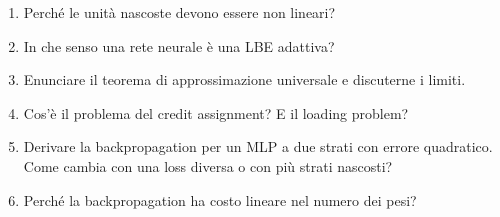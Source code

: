 \begin{domande}
\begin{enumerate}
  \item Perché le unità nascoste devono essere non lineari?
  \item In che senso una rete neurale è una LBE adattiva?
  \item Enunciare il teorema di approssimazione universale e discuterne i limiti.
  \item Cos'è il problema del credit assignment? E il loading problem?
  \item Derivare la backpropagation per un MLP a due strati con errore quadratico. Come cambia con una loss diversa
        o con più strati nascosti?
  \item Perché la backpropagation ha costo lineare nel numero dei pesi?
\end{enumerate}
\end{domande}
